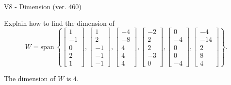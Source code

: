 \begin{exercise}
  \begin{exerciseTitle}V8 - Dimension (ver. 460)\end{exerciseTitle}
  \begin{exerciseStatement}
    Explain how to find the dimension of 
\[W=\mathrm{span}\ \left\{\left[\begin{array}{r}
1 \\
-1 \\
0 \\
2 \\
1
\end{array}\right] , \left[\begin{array}{r}
1 \\
2 \\
-1 \\
-1 \\
-1
\end{array}\right] , \left[\begin{array}{r}
-4 \\
-8 \\
4 \\
4 \\
4
\end{array}\right] , \left[\begin{array}{r}
-2 \\
2 \\
2 \\
-3 \\
0
\end{array}\right] , \left[\begin{array}{r}
0 \\
-4 \\
0 \\
0 \\
-4
\end{array}\right] , \left[\begin{array}{r}
-4 \\
-14 \\
2 \\
8 \\
4
\end{array}\right]\right\}.\]



  \end{exerciseStatement}
  \begin{exerciseAnswer}
   The dimension of \(W\) is  \(4\).
  


  \end{exerciseAnswer}
\end{exercise}